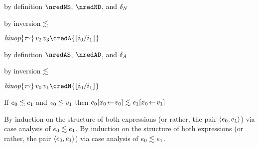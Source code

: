 {\begin{lamportproof*}
    \begin{pfproof}
        \begin{pfproof}
          by definition $\nredNS$, $\nredND$, and $\delta_{N}$
        \end{pfproof}
        \begin{pfproof}
          by inversion $\lesssim$
        \end{pfproof}
      \qedstep
        \begin{pfproof}
          $\ebinopt{\stoptional}{\svalue_2}{\svalue_3} \credA {\floorof{\sint_0 / \sint_1}}$
        \end{pfproof}
    \end{pfproof}

    \begin{pfproof}
        \begin{pfproof}
          by definition $\nredAS$, $\nredAD$, and $\delta_{A}$
        \end{pfproof}
        \begin{pfproof}
          by inversion $\lesssim$
        \end{pfproof}
      \qedstep
        \begin{pfproof}
          $\ebinopt{\stoptional}{\svalue_0}{\svalue_1} \credN {\floorof{\sint_0 / \sint_1}}$
        \end{pfproof}
    \end{pfproof}

\end{lamportproof*}}

\begin{lemma}\label{HA-subst}
  If\/ $e_0 \lesssim e_1$ and\/ $v_0 \lesssim v_1$
  then\/ $e_0[x_0\!\leftarrow\!v_0] \lesssim e_1[x_0\!\leftarrow\!v_1]$
\end{lemma}{
  \newcommand{\shortpf}{By induction on the structure of both expressions (or rather, the pair $\epair{\sexpr_0}{\sexpr_1}$) via case analysis of $\rexpr{\sexpr_0}{\sexpr_1}$.}
\begin{lamportproof*}
  \shortpf
\mainproof
  \shortpf
\end{lamportproof*}}


